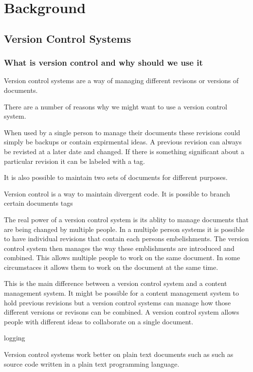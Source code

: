 \chapter{Background}

\section{Version Control Systems}
\subsection{What is version control and why should we use it}
Version control systems are a way of managing different revisons or versions of documents.    


There are a number of reasons why we might want to use a version control system.

When used by a single person to manage their documents these revisions could simply be backups or contain expirmental ideas. A previous revision can always be revisted at a later date and changed. If there is something significant about a particular revision it can be labeled with a tag.  

It is also possible to maintain two sets of documents for different purposes.

Version control is a way to maintain divergent code.
It is possible to branch certain documents
tags

The real power of a version control system is its ablity to manage documents that are being changed by multiple people.  In a multiple person systems it is possible to have individual revisions that contain each persons embelishments. The version control system then manages the way these emblishments are introduced and combined. This allows multiple people to work on the same document. In some circumstaces it allows them to work on the document at the same time.

This is the main difference between a version control system and a content management system.  It might be possible for a content management system to hold previous revisions but  a version control systems can manage how those different versions or revisons can be combined.  A version control system allows people with different ideas to collaborate on a single document.

logging


Version control systems work better on plain text documents such as such as source code written in a plain text programming language.

